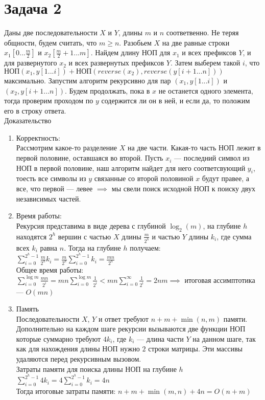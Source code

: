 \documentclass{article}
\begin{document}
\section{Задача 2}
Даны две последовательности $X$ и $Y$, длины $m$ и $n$ соответвенно. Не теряя общности, будем считать, что $m \geq n$. Разобьем $X$ на две равные строки $x_{1}[0...\frac{m}{2}]$ и $x_{2}[\frac{m}{2}+1...m]$. Найдем длину $НОП$ для $x_1$ и всех префиксов $Y$, и для развернутого $x_2$ и всех развернутых префиксов $Y$. Затем выберем такой $i$, что $НОП(x_1, y[1...i])+НОП(reverse(x_2),reverse(y[i+1...n]))$ максимально. Запустим алгоритм рекурсивно для пар $(x_1,y[1...i])$ и $(x_2,y[i+1...n])$. Будем продолжать, пока в $x$ не останется одного элемента, тогда проверим проходом по $y$ содержится ли он в ней, и если да, то положим его в строку ответа.\\
Доказательство\\
\begin{enumerate}
\item Корректность:\\
Рассмотрим какое-то разделение $X$ на две части. Какая-то часть $НОП$ лежит в первой половине, оставшаяся во второй. Пусть $x_i$ --- последний символ из $НОП$ в первой половине, наш алгоритм найдет для него соответсвующий $y_i$, тоесть все символы из $y$ связанные со второй половиной $x$ будут правее, а все, что первой --- левее $\implies$ мы свели поиск исходной НОП к поиску двух независимых частей.
\item Время работы:\\
Рекурсия представима в виде дерева с глубиной $\log_{2}(m)$, на глубине $h$ находятся $2^h$ вершин с частью $X$ длины $\frac{m}{2^h}$ и частью $Y$ длины $k_i$, где сумма всех $k_i$ равна $n$. Тогда на глубине $h$ получаем:\\
$\sum\limits_{i=0}^{2^h-1}\frac{m}{2^h}k_i=\frac{m}{2^h} \sum\limits_{i=0}^{2^h-1}k_i = \frac{mn}{2^h}$\\
Общее время работы:\\
$\sum\limits_{i=0}^{\log{m}}\frac{mn}{2^i}=mn \sum\limits_{i=0}^{\log{m}}\frac{1}{2^i}< mn\sum\limits_{i=0}^{\infty}\frac{1}{2^i}=2nm \implies$ итоговая ассимптотика --- $O(mn)$ 
\item Память\\
Последовательности $X$, $Y$ и ответ требуют $n+m+\min(n,m)$ памяти. Дополнительно на каждом шаге рекурсии вызываются две функции $НОП$ которые суммарно требуют $4k_i$, где $k_i$ --- длина части $Y$ на данном шаге, так как для нахождения длины $НОП$ нужно $2$ строки матрицы. Эти массивы удаляются перед рекурсивным вызовом.\\
Затраты памяти для поиска длины $НОП$ на глубине $h$\\
$\sum\limits_{i=0}^{2^h-1}4k_i= 4 \sum\limits_{i=0}^{2^h-1}k_i=4n$\\
Тогда итоговые затраты памяти: $n+m+\min(m,n)+4n=O(n+m)$
\end{enumerate}
\end{document}
